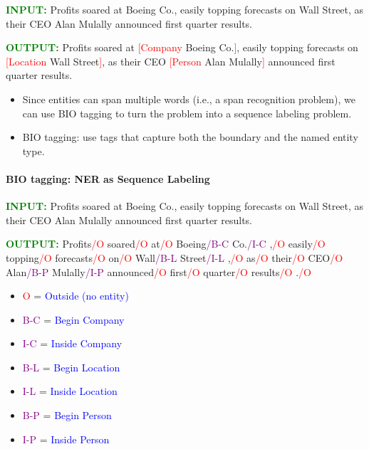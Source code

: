  \textcolor{green}{\textbf{INPUT:}}
  Profits soared at Boeing Co., easily topping forecasts on Wall Street, as their CEO Alan Mulally announced first quarter results.    \vspace{0.5cm}

  \textcolor{green}{\textbf{OUTPUT:}}
  Profits soared at \textcolor{red}{[Company} Boeing Co.\textcolor{red}{]}, easily topping forecasts on \textcolor{red}{[Location} Wall Street\textcolor{red}{]}, as their CEO \textcolor{red}{[Person} Alan Mulally\textcolor{red}{]} announced first quarter results. \vspace{0.5cm}

  \begin{itemize}
   \item  Since entities can span multiple words (i.e., a span recognition problem), we can use BIO tagging \cite{ramshaw1999text} to turn the problem into a sequence labeling problem.
   \item   BIO tagging: use tags that capture both the boundary and the named entity type.
  \end{itemize}


\paragraph{BIO tagging: NER as Sequence Labeling}
   \textcolor{green}{\textbf{INPUT:}}
  Profits soared at Boeing Co., easily topping forecasts on Wall Street, as their CEO Alan Mulally announced first quarter results. \vspace{0.5cm}

  \textcolor{green}{\textbf{OUTPUT:}}
Profits\textcolor{red}{/O} soared\textcolor{red}{/O} at\textcolor{red}{/O} Boeing\textcolor{purple}{/B-C} Co.\textcolor{purple}{/I-C} ,\textcolor{red}{/O} easily\textcolor{red}{/O} topping\textcolor{red}{/O} forecasts\textcolor{red}{/O} on\textcolor{red}{/O} Wall\textcolor{purple}{/B-L} Street\textcolor{purple}{/I-L} ,\textcolor{red}{/O} as\textcolor{red}{/O} their\textcolor{red}{/O} CEO\textcolor{red}{/O} Alan\textcolor{purple}{/B-P} Mulally\textcolor{purple}{/I-P} announced\textcolor{red}{/O} first\textcolor{red}{/O} quarter\textcolor{red}{/O} results\textcolor{red}{/O} .\textcolor{red}{/O} \vspace{0.5cm}


  \begin{itemize}
    \item \textcolor{red}{O} = \textcolor{blue}{Outside (no entity)}
    \item \textcolor{purple}{B-C} = \textcolor{blue}{Begin Company}
    \item \textcolor{purple}{I-C} = \textcolor{blue}{Inside Company}
    \item \textcolor{purple}{B-L} = \textcolor{blue}{Begin Location}
    \item \textcolor{purple}{I-L} = \textcolor{blue}{Inside Location}
    \item \textcolor{purple}{B-P} = \textcolor{blue}{Begin Person}
    \item \textcolor{purple}{I-P} = \textcolor{blue}{Inside Person}
  \end{itemize}


